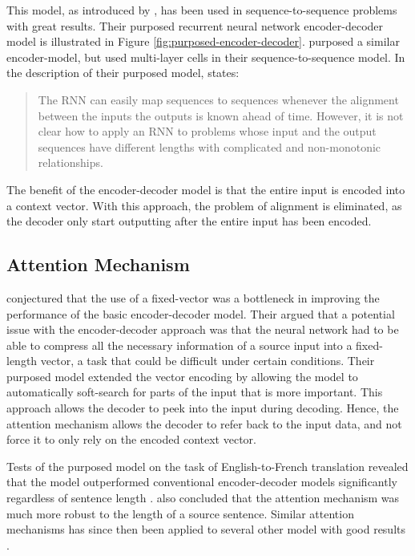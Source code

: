 This model, as introduced by \citep{cho2014learning}, has been used in sequence-to-sequence problems with great results. Their purposed recurrent neural network encoder-decoder model is illustrated in Figure \ref{fig:purposed-encoder-decoder}. \citep{sutskever2014sequence} purposed a similar encoder-model, but used multi-layer cells in their sequence-to-sequence model. In the description of their purposed model, \citep{sutskever2014sequence} states:

\begin{quote}
    The RNN can easily map sequences to sequences whenever the alignment between the inputs the outputs is known ahead of time. However, it is not clear how to apply an RNN to problems whose input and the output sequences have different lengths with complicated and non-monotonic relationships.
\end{quote}

The benefit of the encoder-decoder model is that the entire input is encoded into a context vector. With this approach, the problem of alignment is eliminated, as the decoder only start outputting after the entire input has been encoded.

\subsection{Attention Mechanism}
\label{sec:attention_mechanism}
\citep{bahdanau2014neural} conjectured that the use of a fixed-vector was a bottleneck in improving the performance of the basic encoder-decoder model. Their argued that a potential issue with the encoder-decoder approach was that the neural network had to be able to compress all the necessary information of a source input into a fixed-length vector, a task that could be difficult under certain conditions. Their purposed model extended the vector encoding by allowing the model to automatically soft-search for parts of the input that is more important. This approach allows the decoder to peek into the input during decoding. Hence, the attention mechanism allows the decoder to refer back to the input data, and not force it to only rely on the encoded context vector. 

Tests of the purposed model on the task of English-to-French translation revealed that the model outperformed conventional encoder-decoder models significantly regardless of sentence length \citep{bahdanau2014neural}. \citep{bahdanau2014neural} also concluded that the attention mechanism was much more robust to the length of a source sentence. Similar attention mechanisms has since then been applied to several other model with good results \citep{hsu2016recurrent, sankaran2016temporal}. 

